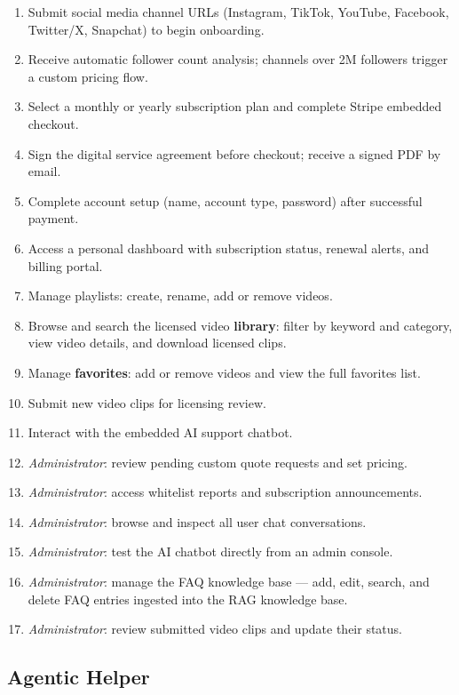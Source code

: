 \begin{enumerate}[label=\textbf{FR-AR-\arabic*}]
  \item Submit social media channel URLs (Instagram, TikTok, YouTube, Facebook, Twitter/X,
    Snapchat) to begin onboarding.
  \item Receive automatic follower count analysis; channels over 2M followers trigger a
    custom pricing flow.
  \item Select a monthly or yearly subscription plan and complete Stripe embedded checkout.
  \item Sign the digital service agreement before checkout; receive a signed PDF by email.
  \item Complete account setup (name, account type, password) after successful payment.
  \item Access a personal dashboard with subscription status, renewal alerts, and billing portal.
  \item Manage playlists: create, rename, add or remove videos.
  \item Browse and search the licensed video \textbf{library}: filter by keyword and category,
    view video details, and download licensed clips.
  \item Manage \textbf{favorites}: add or remove videos and view the full favorites list.
  \item Submit new video clips for licensing review.
  \item Interact with the embedded AI support chatbot.
  \item \textit{Administrator}: review pending custom quote requests and set pricing.
  \item \textit{Administrator}: access whitelist reports and subscription announcements.
  \item \textit{Administrator}: browse and inspect all user chat conversations.
  \item \textit{Administrator}: test the AI chatbot directly from an admin console.
  \item \textit{Administrator}: manage the FAQ knowledge base — add, edit, search, and delete
    FAQ entries ingested into the RAG knowledge base.
  \item \textit{Administrator}: review submitted video clips and update their status.
\end{enumerate}

\subsection{Agentic Helper}

